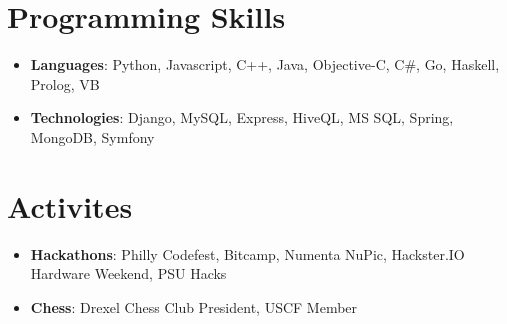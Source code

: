 \documentclass[letterpaper,11pt]{article}
\newcommand{\resumeItem}[2]{
  \item\small{
    \textbf{#1}{: #2 \vspace{-2pt}}
  }
}
\newcommand{\resumeSubItem}[2]{\resumeItem{#1}{#2}\vspace{-4pt}}
\newcommand{\resumeSubHeadingListStart}{\begin{itemize}[leftmargin=*]}
\newcommand{\resumeSubHeadingListEnd}{\end{itemize}}
\begin{document}
\section{Programming Skills}
 \resumeSubHeadingListStart
    \resumeSubItem{Languages}
      {Python, Javascript, C++, Java, Objective-C, C\#, Go, Haskell, Prolog, VB}
    \resumeSubItem{Technologies}
      {Django, MySQL, Express, HiveQL, MS SQL, Spring, MongoDB, Symfony}
 \resumeSubHeadingListEnd

 \section{Activites}
  \resumeSubHeadingListStart
    \resumeSubItem{Hackathons}
      {Philly Codefest, Bitcamp, Numenta NuPic, Hackster.IO Hardware Weekend, PSU Hacks}
    \resumeSubItem{Chess}
      {Drexel Chess Club President, USCF Member}
  \resumeSubHeadingListEnd


\end{document}
